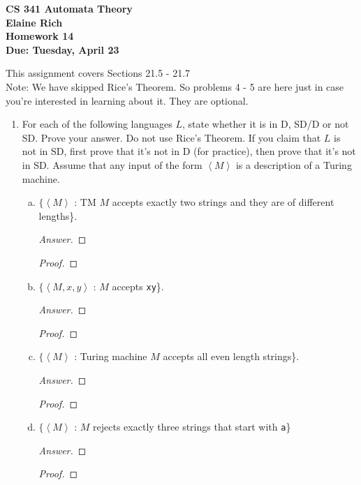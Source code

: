 \documentclass[10pt]{article}
\newcommand{\brackets}[1]{\left< #1 \right>}
\begin{document}
\begin{center}
\textbf{
CS 341 Automata Theory \\
Elaine Rich \\
Homework 14 \\
Due: Tuesday, April 23}\\
\end{center}

\noindent
This assignment covers Sections 21.5 - 21.7\\

\noindent
Note: We have skipped Rice's Theorem. So problems 4 - 5 are here just in case you're interested in learning about it. They are optional.

\begin{enumerate}[1)]


\item
For each of the following languages $L$, state whether it is in D, SD/D or not SD. Prove your answer. Do not use Rice's Theorem. If you claim that $L$ is not in SD, first prove that it's not in D (for practice), then prove that it's not in SD. Assume that any input of the form $\brackets{M}$ is a description of a Turing machine.

\begin{enumerate}[a)]

\item
$\{\brackets{M}$ : TM $M$ accepts exactly two strings and they are of different lengths\}.
\begin{proof}[Answer]
\end{proof}
\begin{proof}[Proof]
\end{proof}

\item
$\{\brackets{M, x, y}$ : $M$ accepts \texttt{xy}\}.
\begin{proof}[Answer]
\end{proof}
\begin{proof}[Proof]
\end{proof}

\item
$\{\brackets{M}$ : Turing machine $M$ accepts all even length strings\}.
\begin{proof}[Answer]
\end{proof}
\begin{proof}[Proof]
\end{proof}

\item
$\{\brackets{M}$ : $M$ rejects exactly three strings that start with \texttt{a}\}
\begin{proof}[Answer]
\end{proof}
\begin{proof}[Proof]
\end{proof}


\end{enumerate}
\end{enumerate}
\end{document}

